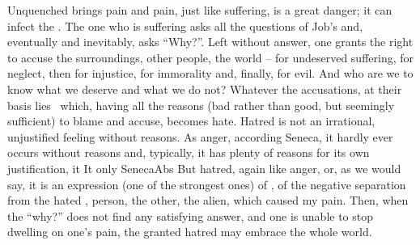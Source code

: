 \pa Unquenched  brings pain and pain, just like suffering, is a great
danger; it can infect the .   The one who is suffering
asks all the questions of Job's and, eventually and inevitably, asks ``Why?''.
Left without answer, one grants  the right to accuse the
surroundings, other people, the world -- for undeserved suffering, for neglect,
then for injustice, for immorality and, finally, for evil.   And who are we to know what we deserve and what
we do not?  Whatever the accusations, at their basis lies \No\ which, having
all the reasons (bad rather than good, but seemingly sufficient) to blame and
accuse, becomes hate. Hatred is not an irrational, unjustified feeling without
reasons. As anger, according Seneca, it hardly ever occurs without reasons and,
typically, it has plenty of reasons for its own justification, it  It only \citet{proceeds to the resolution of a
  revenge, the mind assenting to
  it.}{SenecaAbs}{} But hatred, again like
anger,  or, as we
would say, it is an expression (one of the strongest ones) of ,
of the negative separation from the hated , person, the other, the
alien, which caused my pain.  Then, when the ``why?''  does not find any
satisfying answer, and one is unable to stop dwelling on one's pain, the granted
hatred may embrace the whole world.

